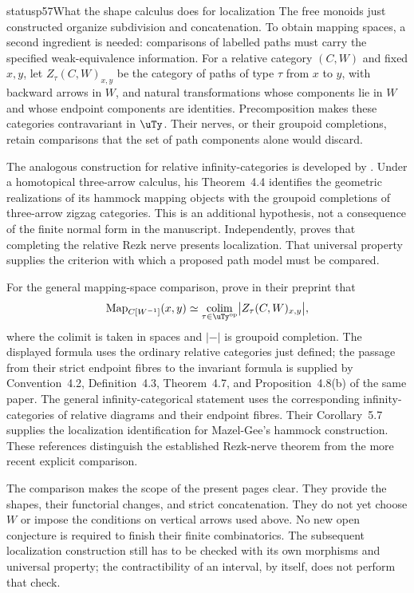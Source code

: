 \begin{dcomment}{status}{p57}{What the shape calculus does for localization}
The free monoids just constructed organize subdivision and concatenation. To obtain mapping spaces, a second ingredient is needed: comparisons of labelled paths must carry the specified weak-equivalence information. For a relative category $(C,W)$ and fixed $x,y$, let $Z_\tau(C,W)_{x,y}$ be the category of paths of type $\tau$ from $x$ to $y$, with backward arrows in $W$, and natural transformations whose components lie in $W$ and whose endpoint components are identities. Precomposition makes these categories contravariant in $\uTy$. Their nerves, or their groupoid completions, retain comparisons that the set of path components alone would discard.

The analogous construction for relative infinity-categories is developed by \citet[Definitions~3.9 and~3.17]{MazelGee2018Hammocks}. Under a homotopical three-arrow calculus, his Theorem~4.4 identifies the geometric realizations of its hammock mapping objects with the groupoid completions of three-arrow zigzag categories. This is an additional hypothesis, not a consequence of the finite normal form in the manuscript. Independently, \citet[Theorem~3.8]{MazelGee2019Rezk} proves that completing the relative Rezk nerve presents localization. That universal property supplies the criterion with which a proposed path model must be compared.

For the general mapping-space comparison, \citet[Theorem~1.9 and Corollary~1.11]{ArakawaCnossen2026} prove in their preprint that
\[
 \operatorname{Map}_{C[W^{-1}]}(x,y)
 \simeq \operatorname*{colim}_{\tau\in\uTy^{\mathrm{op}}}
          \bigl|Z_\tau(C,W)_{x,y}\bigr|,
\]
where the colimit is taken in spaces and $|{-}|$ is groupoid completion. The displayed formula uses the ordinary relative categories just defined; the passage from their strict endpoint fibres to the invariant formula is supplied by Convention~4.2, Definition~4.3, Theorem~4.7, and Proposition~4.8(b) of the same paper. The general infinity-categorical statement uses the corresponding infinity-categories of relative diagrams and their endpoint fibres. Their Corollary~5.7 supplies the localization identification for Mazel-Gee's hammock construction. These references distinguish the established Rezk-nerve theorem from the more recent explicit comparison.

The comparison makes the scope of the present pages clear. They provide the shapes, their functorial changes, and strict concatenation. They do not yet choose $W$ or impose the conditions on vertical arrows used above. No new open conjecture is required to finish their finite combinatorics. The subsequent localization construction still has to be checked with its own morphisms and universal property; the contractibility of an interval, by itself, does not perform that check.
\end{dcomment}
